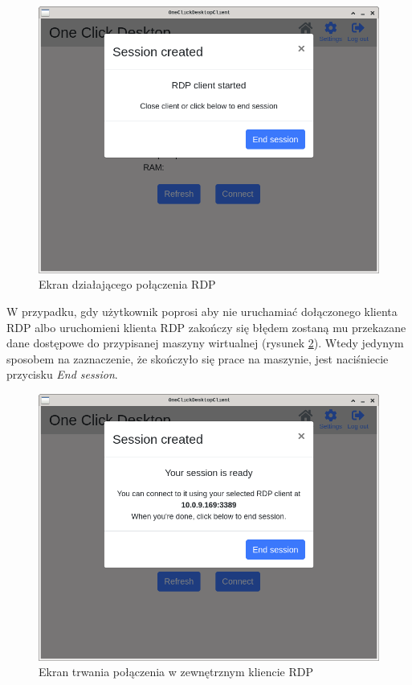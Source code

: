 \documentclass[../opis-rozwiazania.tex]{subfiles}
\begin{document}
\begin{figure}[h!]
  \centering
  \includegraphics[width=\textwidth]{resources/client_session.png}
  \caption{Ekran działającego połączenia RDP}
  \label{figure:system_interaction.client.session}
\end{figure}

W przypadku, gdy użytkownik poprosi aby nie uruchamiać dołączonego klienta RDP albo uruchomieni klienta RDP zakończy się błędem zostaną mu przekazane dane dostępowe do przypisanej maszyny wirtualnej (rysunek \ref{figure:system_interaction.client.session_nordp}).
Wtedy jedynym sposobem na zaznaczenie, że skończyło się prace na maszynie, jest naciśniecie przycisku \textit{End session}.

\begin{figure}[h!]
  \centering
  \includegraphics[width=\textwidth]{resources/client_session_nordp.png}
  \caption{Ekran trwania połączenia w zewnętrznym kliencie RDP}
  \label{figure:system_interaction.client.session_nordp}
\end{figure}
\end{document}
